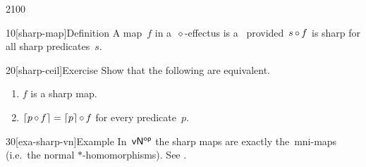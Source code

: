 \begin{parsec}{2100}%
\begin{point}{10}[sharp-map]{Definition}%
A map~$f$ in a~$\diamond$-effectus is a~
    provided~$s \mathop{\circ} f$ is sharp for all sharp predicates~$s$.
\end{point}
\begin{point}{20}[sharp-ceil]{Exercise}%
Show that the following are equivalent.
\begin{enumerate}
    \item $f$ is a sharp map.
    \item $\left\lceil p \mathop{\circ} f\right\rceil = \left\lceil p\right\rceil\mathop{\circ} f$
            for every predicate~$p$.
\end{enumerate}
\end{point}

\begin{point}{30}[exa-sharp-vn]{Example}%
In~${\mathsf{vN}}{^{\mathsf{op}}}$ the sharp maps are exactly the~mni-maps
(i.e.~the normal $*$-homomorphisms).
See .
\end{point}
    
\end{parsec}

